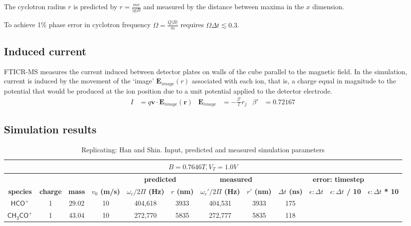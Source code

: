 \documentclass[10pt,conference,onecolumn]{IEEEtran}
\begin{document}
The cyclotron radius $r$ is predicted by $r = \frac{m v}{|q| B}$ and measured by the distance between maxima in the $x$ dimension.

To achieve 1\% phase error in cyclotron frequency $\Omega = \frac{Q|B|}{m}$  requires $\Omega \Delta t \lesssim 0.3$\cite{Birdsall1985,Patacchini2009}.

\subsection{Induced current}

FTICR-MS measures the current induced between detector plates on walls of the cube parallel to the magnetic field.
In the simulation, current is induced by the movement of the `image' $\mathbf{E}_{image}(r)$ associated with each ion, that is, a charge equal in magnitude to the potential that would be produced at the ion position due to a unit potential applied to the detector electrode\cite{Guan1995}.
\begin{align}
I &= q\mathbf{v} \cdot \mathbf{E}_{image}(\mathbf{r}) & \mathbf{E}_{image} &= - \frac{\beta'}{l} r_j & \beta' &= 0.72167
\end{align}

\subsection{Simulation results}

\begin{table}[htbp]
 \centering	  	  
 \caption{Replicating: Han and Shin\cite{Han1997}. Input, predicted and measured simulation parameters}
\label{tab:params}
\begin{tabular}{c|c|c|c|c|c|c|c|c|c|c|c}
 \hline \hline
  \multicolumn{12}{|c|}{$B = 0.7646 T, V_T = 1.0 V$} \\
 \hline \hline
 \multicolumn{4}{|c|}{ } & \multicolumn{2}{|c|}{\textbf{predicted}} & \multicolumn{2}{|c|}{\textbf{measured}} & \multicolumn{4}{|c|}{\textbf{error: timestep}} \\ 
 \hline
 \textbf{species} & \textbf{charge} & \textbf{mass} & \textbf{$v_0$ (m/s)} & \textbf{$\omega_c / 2\Pi$ (Hz)} & \textbf{$r$ (nm)} & \textbf{$\omega_c' / 2\Pi$ (Hz)}  & \textbf{$r'$ (nm)} & \textbf{$\Delta t$ (ns)} & \textbf{$\epsilon: \Delta t$}& \textbf{$\epsilon: \Delta t$ / 10} & \textbf{$\epsilon: \Delta t$ * 10}\\ 
 \hline
 $\mathsf{HCO^+}$ & 1 & 29.02 & 10 & 404,618 & 3933 & 404,531 & 3933 & 175 & \\
 $\mathsf{CH_3CO^+}$ & 1 & 43.04 & 10 & 272,770 & 5835 & 272,777 & 5835 & 118 & \\
 \hline \hline
\end{tabular}
\end{table}
\end{document}
